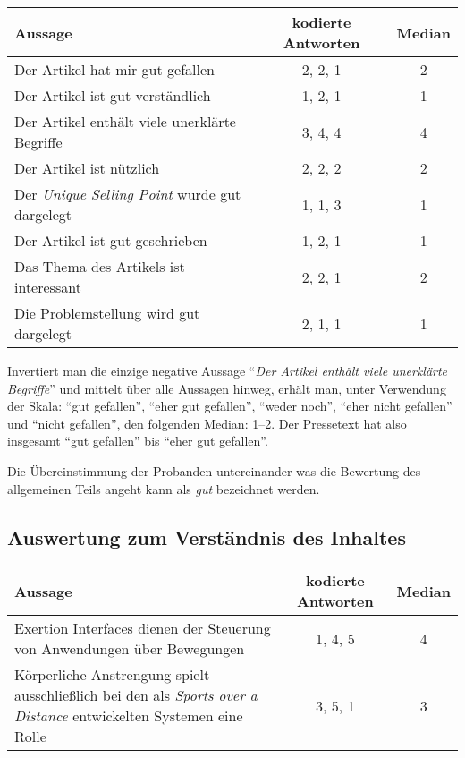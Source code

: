 \begin{table}[!ht]
    \begin{center}
        \begin{tabular}{lcc}
        \toprule
        \textbf{Aussage} & \textbf{kodierte Antworten} & \textbf{Median} \\
        \midrule
        Der Artikel hat mir gut gefallen & 2, 2, 1 & 2 \\
        Der Artikel ist gut verständlich & 1, 2, 1 & 1 \\
        Der Artikel enthält viele unerklärte Begriffe & 3, 4, 4 & 4 \\
        Der Artikel ist nützlich & 2, 2, 2 & 2 \\
        Der \emph{Unique Selling Point} wurde gut dargelegt & 1, 1, 3 & 1 \\
        Der Artikel ist gut geschrieben & 1, 2, 1 & 1 \\
        Das Thema des Artikels ist interessant & 2, 2, 1 & 2 \\
        Die Problemstellung wird gut dargelegt & 2, 1, 1 & 1 \\
        \bottomrule
        \end{tabular}
    \end{center}
\end{table}

Invertiert man die einzige negative Aussage \enquote{\emph{Der Artikel enthält
viele unerklärte Begriffe}} und mittelt über alle Aussagen hinweg, erhält man,
unter Verwendung der Skala: \enquote{gut gefallen}, \enquote{eher gut
gefallen}, \enquote{weder noch}, \enquote{eher nicht gefallen} und
\enquote{nicht gefallen}, den folgenden Median: 1--2.
Der Pressetext hat also insgesamt \enquote{gut gefallen} bis
\enquote{eher gut gefallen}.

Die Übereinstimmung der Probanden untereinander was die Bewertung des
allgemeinen Teils angeht kann als \emph{gut} bezeichnet werden.


\subsection{Auswertung zum Verständnis des Inhaltes}

\begin{table}[!ht]
    \begin{center}
        \begin{tabular}{p{8cm}cc}
        \toprule
        \textbf{Aussage} & \textbf{kodierte Antworten} & \textbf{Median} \\
        \midrule
        Exertion Interfaces dienen der Steuerung von Anwendungen über Bewegungen & 1, 4, 5 & 4 \\
        \addlinespace
        Körperliche Anstrengung spielt ausschließlich bei den als \emph{Sports over a Distance} entwickelten Systemen eine Rolle & 3, 5, 1 & 3 \\
        \bottomrule
        \end{tabular}
    \end{center}
\end{table}

